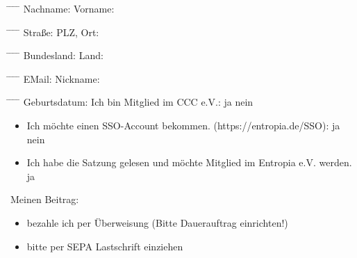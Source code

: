 \documentclass{scrartcl}
\begin{document}
\begin{tabbing}
\hspace*{3cm}\= \hspace*{6cm} \= \hspace*{2cm} \= \hspace*{4cm} \= \kill
Nachname: \> \underline{\hspace{150pt}} \> Vorname: \>  \underline{\hspace{150pt}}
\end{tabbing}
\begin{tabbing}
\hspace*{3cm}\= \hspace*{6cm} \= \hspace*{2cm} \= \hspace*{4cm} \= \kill
Stra{\ss}e: \> \underline{\hspace{150pt}} \> PLZ, Ort: \> \underline{\hspace{150pt}}
\end{tabbing}
\begin{tabbing}
\hspace*{3cm}\= \hspace*{6cm} \= \hspace*{2cm} \= \hspace*{4cm} \= \kill
Bundesland: \> \underline{\hspace{150pt}} \> Land: \> \underline{\hspace{150pt}}
\end{tabbing}
\begin{tabbing}
\hspace*{3cm}\= \hspace*{6cm} \= \hspace*{2cm} \= \hspace*{4cm} \= \kill
EMail: \> \underline{\hspace{150pt}} \> Nickname: \> \underline{\hspace{150pt}}
\end{tabbing}
\begin{tabbing}
\hspace*{3cm}\= \hspace*{6cm} \= \hspace*{2cm} \= \hspace*{4cm} \= \kill
Geburtsdatum: \> \underline{\hspace{150pt}} \> Ich bin Mitglied im CCC e.V.:  \Square ja \Square nein
\end{tabbing}
\begin{itemize}
\item[] Ich möchte einen SSO-Account bekommen. (https://entropia.de/SSO): \Square ja \Square nein
\item[] Ich habe die Satzung gelesen und m\"ochte Mitglied im Entropia e.V. werden.  \Square ja
\end{itemize}
Meinen Beitrag:
\begin{itemize}
\item[\Square] bezahle ich per \"Uberweisung (Bitte Dauerauftrag einrichten!)
\item[\Square] bitte per SEPA Lastschrift einziehen
\end{itemize}
\addvspace{0.4cm}
\end{document}

